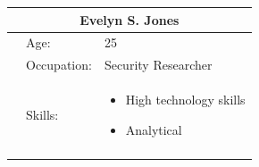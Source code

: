             {\raggedright

            \vspace{3pt} \noindent
            \begin{tabular}{|p{130pt}|p{88pt}|p{207pt}|}
            \hline
            \multicolumn{3}{|c|}{\parbox{426pt}{\centering
            Evelyn S. Jones
            }} \\
            \hline
            \parbox{130pt}{\raggedright {}} & \parbox{88pt}{\raggedright
            Age:
            } & \parbox{207pt}{\raggedright
            25
            } \\
             & \parbox{88pt}{\raggedright
            Occupation:
            } & \parbox{207pt}{\raggedright
            Security Researcher
            } \\
             & \parbox{88pt}{\raggedright
            Skills:
            } & \parbox{207pt}{\raggedright
            \begin{itemize}
                \item High technology skills
                \item Analytical
            \end{itemize}
            } \\
             & \parbox{88pt}{\raggedright
}
\end{tabular}}
